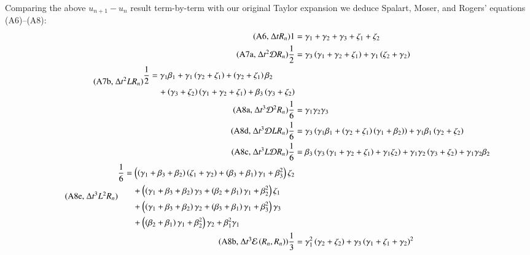 \documentclass[letterpaper,11pt]{amsart}
\begin{document}
Comparing the above $u_{n+1} - u_{n}$ result term-by-term with our
original Taylor expansion we deduce Spalart, Moser, and Rogers' equations
(A6)--(A8):
\begin{align*}
\tag{A6, $\Delta{}t R_{n}$}
1
&=
\gamma_{1} + \gamma_{2} + \gamma_{3} + \zeta_{1} + \zeta_{2}
\\
\tag{A7a, $\Delta{}t^{2} \mathcal{D} R_{n}$}
\frac{1}{2}
&=
\gamma_{3} \left(
  \gamma_{1} + \gamma_{2} + \zeta_{1}
\right)
+
\gamma_{1} \left(
  \zeta_{2} + \gamma_{2}
\right)
\\
\tag{A7b, $\Delta{}t^{2} L R_{n}$}
\begin{split}
\frac{1}{2}
&=
\gamma_{1} \beta_{1}
+
\gamma_{1} \left( \gamma_{2} + \zeta_{1} \right)
+
\left( \gamma_{2} + \zeta_{1} \right) \beta_{2}
\\
&\quad{}+
\left( \gamma_{3} + \zeta_{2} \right)\left(
  \gamma_{1} + \gamma_{2} + \zeta_{1}
\right)
+
\beta_{3} \left( \gamma_{3} + \zeta_{2} \right)
\end{split}
\\
\tag{A8a, $\Delta{}t^{3} \mathcal{D}^{2} R_{n}$}
\frac{1}{6}
&=
\gamma_{1} \gamma_{2} \gamma_{3}
\\
\tag{A8d, $\Delta{}t^{3} \mathcal{D} L R_{n}$}
\frac{1}{6}
&=
\gamma_{3} \left(
  \gamma_{1} \beta_{1}
  +
  \left( \gamma_{2} + \zeta_{1}\right) \left( \gamma_{1} + \beta_{2} \right)
\right)
+
\gamma_{1} \beta_{1} \left(
  \gamma_{2} + \zeta_{2}
\right)
\\
\tag{A8c, $\Delta{}t^{3} L \mathcal{D} R_{n}$}
\frac{1}{6}
&=
\beta_{3} \left(
  \gamma_{3} \left( \gamma_{1} + \gamma_{2} + \zeta_{1} \right)
  +
  \gamma_{1} \zeta_{2}
\right)
+
\gamma_{1} \gamma_{2} \left( \gamma_{3} + \zeta_{2} \right)
+
\gamma_{1} \gamma_{2} \beta_{2}
\\
\tag{A8e, $\Delta{}t^{3} L^{2} R_{n}$}
\begin{split}
\frac{1}{6}
&=
\left(
  \left( \gamma_{1} + \beta_{3} + \beta_{2} \right)
  \left( \zeta_{1} + \gamma_{2} \right)
  +
  \left( \beta_{3} + \beta_{1} \right) \gamma_{1}
  +
  \beta_{3}^{2}
\right) \zeta_{2}
\\
&\quad{}+
\left(
  \left( \gamma_{1} + \beta_{3} + \beta_{2} \right) \gamma_{3}
  +
  \left( \beta_{2} + \beta_{1} \right) \gamma_{1}
  +
  \beta_{2}^{2}
\right) \zeta_{1}
\\
&\quad{}+
\left(
  \left( \gamma_{1} + \beta_{3} + \beta_{2} \right) \gamma_{2}
  +
  \left( \beta_{3} + \beta_{1} \right) \gamma_{1}
  +
  \beta_{3}^{2}
\right) \gamma_{3}
\\
&\quad{}+
\left(
  \left( \beta_{2} + \beta_{1} \right) \gamma_{1}
  +
  \beta_{2}^{2}
\right) \gamma_{2}
+
\beta_{1}^{2} \gamma_{1}
\end{split}
\\
\tag{A8b, $\Delta{}t^{3} \mathcal{E}\left( R_{n}, R_{n} \right)$}
\frac{1}{3}
&=
\gamma_{1}^{2} \left( \gamma_{2} + \zeta_{2} \right)
+
\gamma_{3} \left( \gamma_{1} + \zeta_{1} + \gamma_{2} \right)^{2}
\end{align*}
\end{document}

